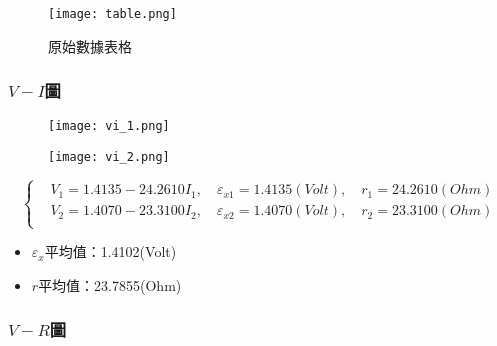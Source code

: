 \documentclass[12pt]{article}
\begin{document}
        \begin{figure}[h]
            \begin{minipage}{0.99\textwidth}
                \centering
                \texttt{[image: table.png]}
                \caption{原始數據表格}
                \label{fig:table}
            \end{minipage}
        \end{figure}

            \newpage

                \subsubsection{$V-I$圖}

                \begin{figure}[h]
                    \begin{minipage}{0.49\textwidth}
                        \centering

                        \texttt{[image: vi\_1.png]}
                        \caption{}
                        \label{fig:vi_1}
                    \end{minipage}
                    \begin{minipage}{0.49\textwidth}
                        \centering

                        \texttt{[image: vi\_2.png]}
                        \caption{}
                        \label{fig:vi_2}
                    \end{minipage}
                \end{figure}

                $$
                \begin{cases}
                    &V_{1}=1.4135-24.2610I_1, \quad \varepsilon_{x1}=1.4135(Volt),\quad r_1=24.2610(Ohm)\\
                    &V_{2}=1.4070-23.3100I_2, \quad \varepsilon_{x2}=1.4070(Volt),\quad r_2=23.3100(Ohm)\\
                \end{cases}
                $$
                \begin{itemize}
                    \item $\varepsilon_x$平均值：1.4102(Volt)
                    \item $r$平均值：23.7855(Ohm)
                \end{itemize}

                \subsubsection{$V-R$圖}
                    
\end{document}
